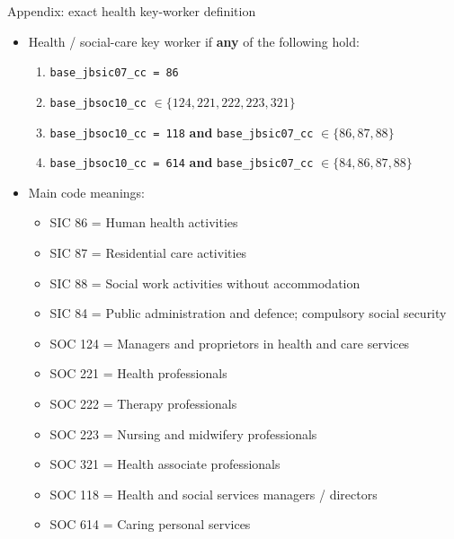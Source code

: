 \documentclass[aspectratio=169,11pt]{beamer}
\begin{document}
\begin{frame}{Appendix: exact health key-worker definition} \label{health-keyworker-sec}
\begin{itemize}
  \item Health / social-care key worker if \textbf{any} of the following hold:
    \begin{enumerate}
      \item \texttt{base\_jbsic07\_cc = 86}
      \item \texttt{base\_jbsoc10\_cc} $\in \{124,221,222,223,321\}$
      \item \texttt{base\_jbsoc10\_cc = 118} \textbf{and} \texttt{base\_jbsic07\_cc} $\in \{86,87,88\}$
      \item \texttt{base\_jbsoc10\_cc = 614} \textbf{and} \texttt{base\_jbsic07\_cc} $\in \{84,86,87,88\}$
    \end{enumerate}
  \item Main code meanings:
    \begin{itemize}
      \item SIC 86 = Human health activities
      \item SIC 87 = Residential care activities
      \item SIC 88 = Social work activities without accommodation
      \item SIC 84 = Public administration and defence; compulsory social security
      \item SOC 124 = Managers and proprietors in health and care services
      \item SOC 221 = Health professionals
      \item SOC 222 = Therapy professionals
      \item SOC 223 = Nursing and midwifery professionals
      \item SOC 321 = Health associate professionals
      \item SOC 118 = Health and social services managers / directors
      \item SOC 614 = Caring personal services
    \end{itemize}
\end{itemize}

\hyperlink{group_defs}{}
\end{frame}
\end{document}

